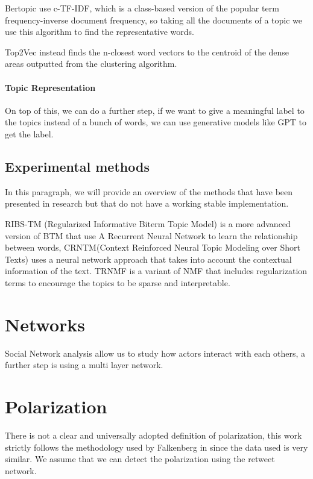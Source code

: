 Bertopic use c-TF-IDF, which is a class-based version of the popular term frequency-inverse document frequency, so taking all the documents of a topic we use this algorithm to find the representative words.

Top2Vec instead finds the n-closest word vectors to the centroid of the dense areas outputted from the clustering algorithm.


\paragraph{Topic Representation}
On top of this, we can do a further step, if we want to give a meaningful label to the topics instead of a bunch of words, we can use generative models like GPT to get the label.


\subsection{Experimental methods}
In this paragraph, we will provide an overview of the methods that have been presented in research but that do not have a working stable implementation.

RIBS-TM (Regularized Informative Biterm Topic Model) \cite{lu_RIBS_2017}is a more advanced version of BTM that use A Recurrent Neural Network to learn the relationship between words, CRNTM(Context Reinforced Neural Topic Modeling over Short Texts) \cite{feng_context_2020}  uses a neural network approach that takes into account the contextual information of the text. TRNMF\cite{yi_topic_2020}  is a variant of NMF that includes regularization terms to encourage the topics to be sparse and interpretable.


\section[Networks]{Networks}
Social Network analysis allow us to study how actors interact with each others, a further step is using a multi layer network.

\section[Polarization]{Polarization}
There is not a clear and universally adopted definition of polarization, this work strictly follows the methodology used by Falkenberg in \cite{falkenberg_growing_2022} since the data used is very similar. We assume that we can detect the polarization using the retweet network.

